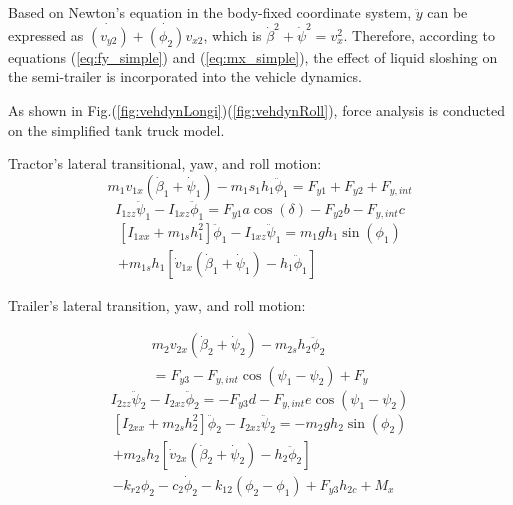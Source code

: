 Based on Newton's equation in the body-fixed coordinate system, $\ddot{y}$ can be expressed as $\dot{(v_{y2})}+\dot{(\phi_2)}v_{x2}$, which is $\dot{\beta}^2 + \dot{\psi}^2 = v_x^2$. Therefore, according to equations (\ref{eq:fy_simple}) and (\ref{eq:mx_simple}), the effect of liquid sloshing on the semi-trailer is incorporated into the vehicle dynamics.

As shown in Fig.(\ref{fig:vehdynLongi})(\ref{fig:vehdynRoll}), force analysis is conducted on the simplified tank truck model.

Tractor's lateral transitional, yaw, and roll motion:
\vspace{-0.3cm}
\begin{equation}
m_1 v_{1x} (\dot{\beta}_1 + \dot{\psi}_1) - m_1 s_1 h_1 \ddot{\phi}_1 = F_{y1} + F_{y2} + F_{y, int}
\end{equation}
\vspace{-10pt}
\begin{equation}
I_{1zz} \ddot{\psi}_1 - I_{1xz} \ddot{\phi}_1 = F_{y1} a \cos(\delta) - F_{y2} b - F_{y, int} c
\end{equation}
\vspace{-10pt}
\begin{equation}
\begin{split}
[I_{1xx} + m_{1s} h_1^2] \ddot{\phi}_1 - I_{1xz} \ddot{\psi}_1 = m_1 g h_1 \sin(\phi_1) \\
 + m_{1s} h_1 [\dot{v}_{1x} (\dot{\beta}_1 + \dot{\psi}_1) - h_1 \ddot{\phi}_1]
\end{split}
\end{equation}
\vspace{-0.3cm}

Trailer's lateral transition, yaw, and roll motion:

\begin{equation}
\begin{split}
m_2 v_{2x} (\dot{\beta}_2 + \dot{\psi}_2) - m_{2s} h_2 \ddot{\phi}_2 \\= F_{y3} - F_{y, int} \cos(\psi_1 - \psi_2) + F_y 
\end{split}
\end{equation}
\vspace{-10pt}
\begin{equation}
I_{2zz} \ddot{\psi}_2 - I_{2xz} \ddot{\phi}_2 = - F_{y3} d - F_{y, int} e \cos(\psi_1 - \psi_2)
\end{equation}
\vspace{-10pt}
\begin{equation}
\begin{split}
[I_{2xx} + m_{2s} h_2^2] \ddot{\phi}_2 - I_{2xz} \ddot{\psi}_2 = -m_2 g h_2 \sin(\phi_2) \\
 + m_{2s} h_2 [\dot{v}_{2x} (\dot{\beta}_2 + \dot{\psi}_2) - h_2 \ddot{\phi}_2] \\
- k_{r2} \phi_2 - c_2 \dot{\phi}_2 - k_{12} (\phi_2 - \phi_1) + F_{y3} h_{2c} + M_x 
\end{split}
\end{equation}


